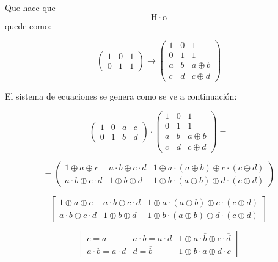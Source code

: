 \begin{enumerate}
\begin{enumerate}
\begin{enumerate}
\begin{enumerate}
        Que hace
        que\[\mathtt{\mathrm{H}} \cdot \mathtt{\mathrm{o}}\]quede como:

        \[\begin{pmatrix}
        1 & 0 & 1 \\
        0 & 1 & 1
        \end{pmatrix}\rightarrow\begin{pmatrix}
        1 & 0 & 1 \\
        0 & 1 & 1 \\
        a & b & {a \oplus b} \\
        c & d & {c \oplus d}
        \end{pmatrix}\]

        El sistema de ecuaciones se genera como se ve a continuación:

        \[{\begin{pmatrix}
        1 & 0 & a & c \\
        0 & 1 & b & d
        \end{pmatrix} \cdot \begin{pmatrix}
        1 & 0 & 1 \\
        0 & 1 & 1 \\
        a & b & {a \oplus b} \\
        c & d & {c \oplus d}
        \end{pmatrix}} =\]

        \[= \begin{pmatrix}
        {1 \oplus a \oplus c} & {{a \cdot b} \oplus {c \cdot d}} & {1 \oplus {a \cdot {({a \oplus b})}} \oplus {c \cdot {({c \oplus d})}}} \\
        {{a \cdot b} \oplus {c \cdot d}} & {1 \oplus b \oplus d} & {1 \oplus {b \cdot {({a \oplus b})}} \oplus {d \cdot {({c \oplus d})}}}
        \end{pmatrix}\]

        \[\begin{bmatrix}
        {1 \oplus a \oplus c} & {{a \cdot b} \oplus {c \cdot d}} & {1 \oplus {a \cdot {({a \oplus b})}} \oplus {c \cdot {({c \oplus d})}}} \\
        {{a \cdot b} \oplus {c \cdot d}} & {1 \oplus b \oplus d} & {1 \oplus {b \cdot {({a \oplus b})}} \oplus {d \cdot {({c \oplus d})}}}
        \end{bmatrix}\]

        \[\begin{bmatrix}
        {c = \overline{a}} & {{a \cdot b} = {\overline{a} \cdot d}} & {1 \oplus {a \cdot \overline{b}} \oplus {c \cdot \overline{d}}} \\
        {{a \cdot b} = {\overline{a} \cdot d}} & {d = \overline{b}} & {1 \oplus {b \cdot \overline{a}} \oplus {d \cdot \overline{c}}}
        \end{bmatrix}\]


\end{enumerate}
\end{enumerate}
\end{enumerate}
\end{enumerate}
